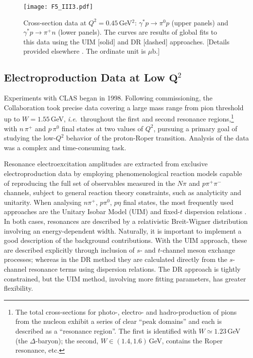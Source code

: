 \begin{figure}[t]
\centerline{\texttt{[image: F5\_III3.pdf]}}
\caption{\label{Roper_lowQ}
Cross-section data at $Q^2=0.45\,$GeV$^2$: $\gamma^\ast p \to \pi^0 p$ (upper panels) and $\gamma^\ast p \to \pi^+ n$ (lower panels).  The curves are results of global fits to this data using the UIM [solid] and DR [dashed] approaches.  [Details provided elsewhere \cite{Aznauryan:2004jd}.  The ordinate unit is $\mu$b.]}
\end{figure}

\subsection{Electroproduction Data at Low $\mathbf Q^2$}
%
Experiments with CLAS began in 1998. Following commissioning, the Collaboration took precise data covering a large mass range from pion threshold up to $W=1.55\,$GeV, \emph{i.e}.\ throughout the first and second resonance regions,\footnote{
The total cross-sections for photo-, electro- and hadro-production of pions from the nucleon exhibit a series of clear ``peak domains'' and each is described as a ``resonance region''.  The first is identified with $W\simeq 1.23\,$GeV (the $\Delta$-baryon); the second, $W\in (1.4,1.6)\,$GeV, contains the Roper resonance, etc.}
%
with $n\,\pi^+$  and $p\,\pi^0$ final states at two values of $Q^2$, pursuing a primary goal of studying the low-$Q^2$ behavior of the proton-Roper transition.  Analysis of the data was a complex and time-consuming task.

Resonance electroexcitation amplitudes are extracted from exclusive electroproduction data by employing phenomenological reaction models capable of reproducing the full set of observables measured in the $N \pi$ and $p \pi^+ \pi^-$ channels, subject to general reaction theory constraints, such as analyticity and unitarity.  When analysing $n \pi^+$, $p \pi^0$, $p \eta$ final states, the most frequently used approaches are the Unitary Isobar Model (UIM) \cite{Drechsel:1998hk, Aznauryan:2002gd, Drechsel:2007if} and fixed-$t$ dispersion relations \cite{Aznauryan:2004jd}.  In both cases, resonances are described by a relativistic Breit-Wigner distribution involving an energy-dependent width.  Naturally, it is important to implement a good description of the background contributions.  With the UIM approach, these are described explicitly through inclusion of $s$- and $t$-channel meson exchange processes; whereas in the DR method they are calculated directly from the $s$-channel resonance terms using dispersion relations.  The DR approach is tightly constrained, but the UIM method, involving more fitting parameters, has greater flexibility.

